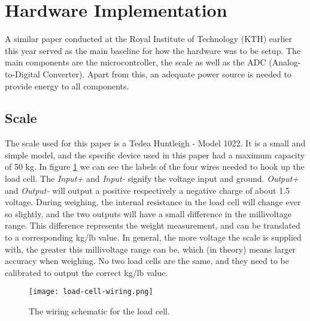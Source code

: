 




\section{Hardware Implementation}

A similar paper conducted at the Royal Institute of Technology (KTH) earlier this year served as the main baseline for how the hardware was to be setup.\cite{hospital} The main components are the microcontroller, the scale as well as the ADC (Analog-to-Digital Converter). Apart from this, an adequate power source is needed to provide energy to all components. 

\subsection{Scale}
The scale used for this paper is a Tedea Huntleigh - Model 1022. It is a small and simple model, and the specific device used in this paper had a maximum capacity of 50 kg.\cite{load-cell-data} In figure \ref{fig:load_cell_wiring} we can see the labels of the four wires needed to hook up the load cell. The \textit{Input+} and \textit{Input-} signify the voltage input and ground. \cite{load-cell-spec} \textit{Output+} and \textit{Output-} will output a positive respectively a negative charge of about 1.5 voltage. During weighing, the internal resistance in the load cell will change ever so slightly, and the two outputs will have a small difference in the millivoltage range. This difference represents the weight measurement, and can be translated to a corresponding kg/lb value. In general, the more voltage the scale is supplied with, the greater this millivoltage range can be, which (in theory) means larger accuracy when weighing. No two load cells are the same, and they need to be calibrated to output the correct kg/lb value.

\begin{figure}[h]
	\centering
	\texttt{[image: load-cell-wiring.png]}
	\caption{The wiring schematic for the load cell.}
	\label{fig:load_cell_wiring}
\end{figure}


